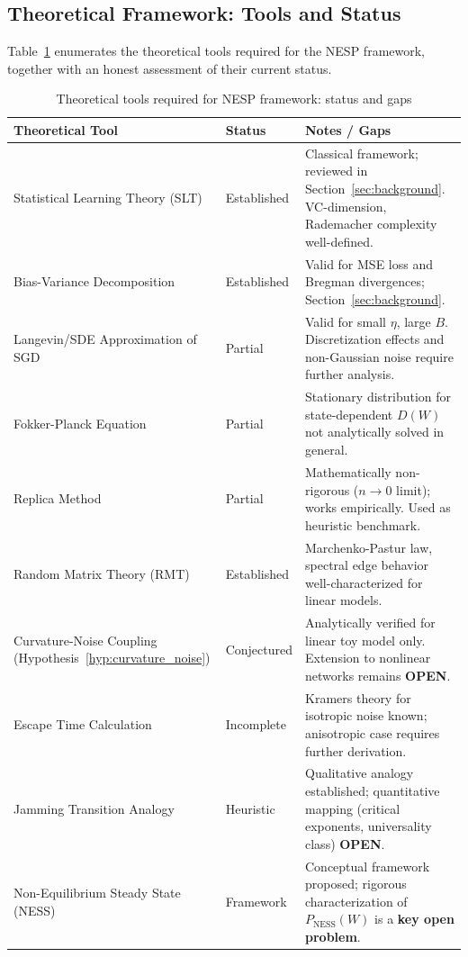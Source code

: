 \documentclass[
  journal=largetwo,
  simfonts=false,
  year=2025,
  volume=37,
]{cup-journal}
\begin{document}
\subsection{Theoretical Framework: Tools and Status}

Table~\ref{tab:theoretical_requirements} enumerates the theoretical tools required for the NESP framework, together with an honest assessment of their current status.

\begin{table}[htb]
\centering
\footnotesize
\caption{Theoretical tools required for NESP framework: status and gaps}
\label{tab:theoretical_requirements}
\begin{tabular}{ p{3.5cm}p{2cm}p{6cm} }
\toprule
\textbf{Theoretical Tool} & \textbf{Status} & \textbf{Notes / Gaps} \\
\midrule
Statistical Learning Theory (SLT) & \textcolor{green!60!black}{Established} & Classical framework; reviewed in Section~\ref{sec:background}. VC-dimension, Rademacher complexity well-defined. \\
\addlinespace[2pt]
Bias-Variance Decomposition & \textcolor{green!60!black}{Established} & Valid for MSE loss and Bregman divergences; Section~\ref{sec:background}. \\
\addlinespace[2pt]
Langevin/SDE Approximation of SGD & \textcolor{orange!80!black}{Partial} & Valid for small $\eta$, large $B$. Discretization effects and non-Gaussian noise require further analysis. \\
\addlinespace[2pt]
Fokker-Planck Equation & \textcolor{orange!80!black}{Partial} & Stationary distribution for state-dependent $D(W)$ not analytically solved in general. \\
\addlinespace[2pt]
Replica Method & \textcolor{orange!80!black}{Partial} & Mathematically non-rigorous ($n\to 0$ limit); works empirically. Used as heuristic benchmark. \\
\addlinespace[2pt]
Random Matrix Theory (RMT) & \textcolor{green!60!black}{Established} & Marchenko-Pastur law, spectral edge behavior well-characterized for linear models. \\
\addlinespace[2pt]
Curvature-Noise Coupling (Hypothesis~\ref{hyp:curvature_noise}) & \textcolor{red!70!black}{Conjectured} & Analytically verified for linear toy model only. Extension to nonlinear networks remains \textbf{OPEN}. \\
\addlinespace[2pt]
Escape Time Calculation & \textcolor{red!70!black}{Incomplete} & Kramers theory for isotropic noise known; anisotropic case requires further derivation. \\
\addlinespace[2pt]
Jamming Transition Analogy & \textcolor{orange!80!black}{Heuristic} & Qualitative analogy established; quantitative mapping (critical exponents, universality class) \textbf{OPEN}. \\
\addlinespace[2pt]
Non-Equilibrium Steady State (NESS) & \textcolor{red!70!black}{Framework} & Conceptual framework proposed; rigorous characterization of $P_{\text{NESS}}(W)$ is a \textbf{key open problem}. \\
\bottomrule
\end{tabular}
\end{table}
\end{document}
